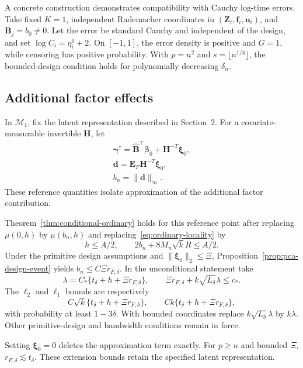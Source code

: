 A concrete construction demonstrates compatibility with Cauchy log-time errors. Take fixed $K=1$, independent Rademacher coordinates in $(\bm{Z}_i,\bm{f}_i,\bm{u}_i)$, and $\bm{B}_j=b_0\ne0$. Let the error be standard Cauchy and independent of the design, and set $\log C_i=\eta_i^0+2$. On $[-1,1]$, the error density is positive and $G=1$, while censoring has positive probability. With $p=n^2$ and $s=\lfloor n^{1/4}\rfloor$, the bounded-design condition holds for polynomially decreasing $\delta_n$.

\subsection{Additional factor effects}
\label{subsec:augmented-guarantee}
In $\mathcal M_1$, fix the latent representation described in Section~2. For a covariate-measurable invertible $\bm{H}$, let
\begin{equation}
 \begin{gathered}
\bm{\gamma}^\dagger=\widehat{\bm{B}}^\top\bm{\beta}_0+\bm{H}^{-T}\bm{\xi}_0,\\
 \mathbf d=\bm{E}_F\bm{H}^{-T}\bm{\xi}_0,\\
 b_n=\|\mathbf d\|_\infty.
 \end{gathered}
 \label{eq:extension-reference}
\end{equation}
These reference quantities isolate approximation of the additional factor contribution.
\begin{corollary}
\label{cor:augmented}
Theorem~\ref{thm:conditional-ordinary} holds for this reference point after replacing $\mu(0,h)$ by $\mu(b_n,h)$ and replacing~\eqref{eq:ordinary-locality} by
\begin{equation}
 h\le A/2,\qquad 2b_n+8M_n\sqrt{k}R\le A/2.
 \label{eq:extension-locality}
\end{equation}
Under the primitive design assumptions and $\|\bm{\xi}_0\|_2\le\Xi$, Proposition~\ref{prop:pca-design-event} yields $b_n\le C\Xi r_{F,\delta}$. In the unconditional statement take
\begin{equation}
 \lambda=C_*\{t_\delta+h+\Xi r_{F,\delta}\},\qquad
 \Xi r_{F,\delta}+k\sqrt{L_\delta}\lambda\le c_*.
 \label{eq:extension-tuning}
\end{equation}
The $\ell_2$ and $\ell_1$ bounds are respectively
\begin{equation}
 C\sqrt{k}\{t_\delta+h+\Xi r_{F,\delta}\},\qquad
 Ck\{t_\delta+h+\Xi r_{F,\delta}\},
 \label{eq:extension-rates}
\end{equation}
with probability at least $1-3\delta$. With bounded coordinates replace $k\sqrt{L_\delta}\lambda$ by $k\lambda$. Other primitive-design and bandwidth conditions remain in force.
\end{corollary}
Setting $\bm{\xi}_0=0$ deletes the approximation term exactly. For $p\ge n$ and bounded $\Xi$, $r_{F,\delta}\lesssim t_\delta$. These extension bounds retain the specified latent representation.

